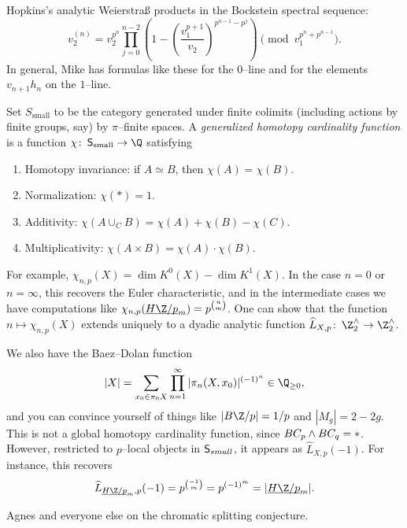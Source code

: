 Hopkins's analytic Weierstra\ss{} products in the Bockstein spectral sequence: \[v_2^{(n)} = v_2^{p^n} \prod_{j=0}^{n-2} \left(1 - \left( \frac{v_1^{p+1}}{v_2} \right)^{p^{n-1} - p^j} \right) \pmod{v_1^{p^n + p^{n-1}}}.\]  In general, Mike has formulas like these for the $0$--line and for the elements $v_{n+1} h_n$ on the $1$--line.

\begin{remark}
Set $S_{\mathrm{small}}$ to be the category generated under finite colimits (including actions by finite groups, say) by $\pi$--finite spaces.  A \textit{generalized homotopy cardinality function} is a function $\chi\co \CatOf S_{\mathrm{small}} \to \Q$ satisfying
\begin{enumerate}
    \item Homotopy invariance: if $A \simeq B$, then $\chi(A) = \chi(B)$.
    \item Normalization: $\chi(*) = 1$.
    \item Additivity: $\chi(A \cup_C B) = \chi(A) + \chi(B) - \chi(C)$.
    \item Multiplicativity: $\chi(A \times B) = \chi(A) \cdot \chi(B)$.
\end{enumerate}
For example, $\chi_{n,p}(X) = \dim K^0(X) - \dim K^1(X)$.  In the case $n = 0$ or $n = \infty$, this recovers the Euler characteristic, and in the intermediate cases we have computations like $\chi_{n,p}(\OS{H\Z/p}{m}) = p^{\binom{n}{m}}$.  One can show that the function $n \mapsto \chi_{n, p}(X)$ extends uniquely to a dyadic analytic function $\widehat L_{X,p}\co \Z^\wedge_2 \to \Z^\wedge_2$.

We also have the Baez--Dolan function \[|X| = \sum_{x_0 \in \pi_0 X} \prod_{n=1}^\infty |\pi_n (X, x_0)|^{(-1)^n} \in \Q_{\ge 0},\] and you can convince yourself of things like $|B\Z/p| = 1/p$ and $|M_g| = 2 - 2g$.  This is not a global homotopy cardinality function, since $BC_p \wedge BC_q = *$.  However, restricted to $p$--local objects in $\mathsf{S}_{small}$, it appears as $\widehat L_{X,p}(-1)$.  For instance, this recovers \[\widehat L_{\OS{H\Z/p}{m}, p}(-1) = p^{\binom{-1}{m}} = p^{(-1)^m} = |\OS{H\Z/p}{m}|.\]
\end{remark}

Agnes and everyone else on the chromatic splitting conjecture.







